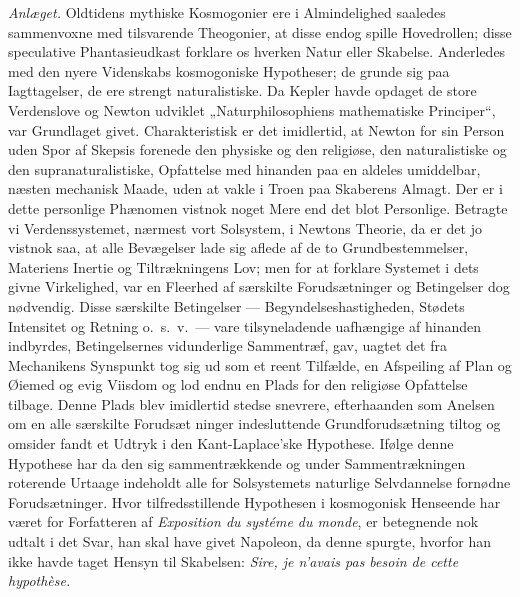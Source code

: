 \documentclass[12pt]{book}
\begin{document}
\emph{Anlæget.} Oldtidens mythiske Kosmogonier ere i Almindelighed
saaledes sammenvoxne med tilsvarende Theogonier, at disse endog
spille Hovedrollen; disse speculative Phantasieudkast forklare os
hverken Natur eller Skabelse. Anderledes med den nyere Videnskabs
kosmogoniske Hypotheser; de grunde sig paa Iagttagelser, de ere
strengt naturalistiske. Da Kepler havde opdaget de store Verdenslove
og Newton udviklet „Naturphilosophiens mathematiske Principer“, var
Grundlaget givet. Charakteristisk er det imidlertid, at Newton for
sin Person uden Spor af Skepsis forenede den physiske og den
religiøse, den naturalistiske og den supranaturalistiske, Opfattelse
med hinanden paa en aldeles umiddelbar, næsten mechanisk Maade, uden
at vakle i Troen paa Skaberens Almagt. Der er i dette personlige
Phænomen vistnok noget Mere end det blot Personlige. Betragte vi
Verdenssystemet, nærmest vort Solsystem, i Newtons Theorie, da er
det jo vistnok saa, at alle Bevægelser lade sig aflede af de to
Grundbestemmelser, Materiens Inertie og Tiltrækningens Lov; men for
at forklare Systemet i dets givne Virkelighed, var en Fleerhed af
særskilte Forudsætninger og Betingelser dog nødvendig. Disse
særskilte Betingelser --- Begyndelseshastigheden, Stødets Intensitet
og Retning o.\ s.\ v.\ --- vare tilsyneladende uafhængige af
hinanden indbyrdes, Betingelsernes vidunderlige Sammentræf, gav,
uagtet det fra Mechanikens Synspunkt tog sig ud som et reent
Tilfælde, en Afspeiling af Plan og Øiemed og evig Viisdom og lod
endnu en Plads for den religiøse Opfattelse tilbage. Denne Plads
blev imidlertid stedse snevrere, efterhaanden som Anelsen om en alle
særskilte Forudsæt\-
ninger indesluttende Grundforudsætning tiltog og omsider fandt et
Udtryk i den Kant-Laplace'ske Hypothese. Ifølge denne Hypothese har
da den sig sammentrækkende og under Sammentrækningen roterende
Urtaage indeholdt alle for Solsystemets naturlige Selvdannelse
fornødne Forudsætninger. Hvor tilfredsstillende Hypothesen i
kosmogonisk Henseende har været for Forfatteren af
\textit{Exposition du systéme du monde}, er betegnende nok udtalt i
det Svar, han skal have givet Napoleon, da denne spurgte, hvorfor
han ikke havde taget Hensyn til Skabelsen: \textit{Sire, je n'avais
pas besoin de cette hypothèse.}
\end{document}
